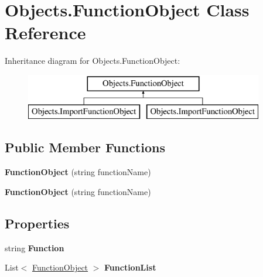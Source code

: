 \hypertarget{class_objects_1_1_function_object}{}\section{Objects.\+Function\+Object Class Reference}
\label{class_objects_1_1_function_object}
Inheritance diagram for Objects.\+Function\+Object\+:\begin{figure}[H]
\begin{center}
\leavevmode
\includegraphics[height=2.000000cm]{class_objects_1_1_function_object}
\end{center}
\end{figure}
\subsection*{Public Member Functions}
\begin{DoxyCompactItemize}
\item 
\mbox{\label{class_objects_1_1_function_object_a0e403a4988373d12b04c406e32537a37}} 
{\bfseries Function\+Object} (string function\+Name)
\item 
\mbox{\label{class_objects_1_1_function_object_a0e403a4988373d12b04c406e32537a37}} 
{\bfseries Function\+Object} (string function\+Name)
\end{DoxyCompactItemize}
\subsection*{Properties}
\begin{DoxyCompactItemize}
\item 
\mbox{\label{class_objects_1_1_function_object_a90ab3223aba8ad7b9c5fe920c35b5b08}} 
string {\bfseries Function}
\item 
\mbox{\label{class_objects_1_1_function_object_ad7a7be97d7003d8cd6e70c83d4b15178}} 
List$<$ \mbox{\hyperlink{class_objects_1_1_function_object}{Function\+Object}} $>$ {\bfseries Function\+List}
\end{DoxyCompactItemize}


